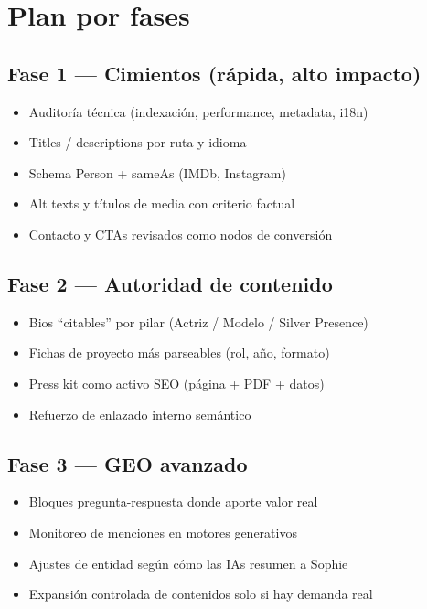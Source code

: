 \documentclass[11pt,a4paper]{article}
\begin{document}
\section{Plan por fases}

\subsection{Fase 1 --- Cimientos (rápida, alto impacto)}
\begin{itemize}
  \item Auditoría técnica (indexación, performance, metadata, i18n)
  \item Titles / descriptions por ruta y idioma
  \item Schema Person + sameAs (IMDb, Instagram)
  \item Alt texts y títulos de media con criterio factual
  \item Contacto y CTAs revisados como nodos de conversión
\end{itemize}

\subsection{Fase 2 --- Autoridad de contenido}
\begin{itemize}
  \item Bios ``citables'' por pilar (Actriz / Modelo / Silver Presence)
  \item Fichas de proyecto más parseables (rol, año, formato)
  \item Press kit como activo SEO (página + PDF + datos)
  \item Refuerzo de enlazado interno semántico
\end{itemize}

\subsection{Fase 3 --- GEO avanzado}
\begin{itemize}
  \item Bloques pregunta-respuesta donde aporte valor real
  \item Monitoreo de menciones en motores generativos
  \item Ajustes de entidad según cómo las IAs resumen a Sophie
  \item Expansión controlada de contenidos solo si hay demanda real
\end{itemize}
\end{document}
